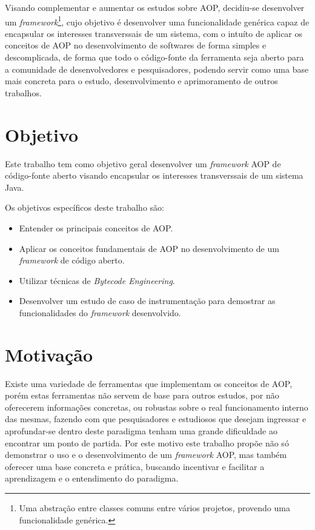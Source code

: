 \documentclass[tc,openright]{iiufrgs}
\begin{document}
Visando complementar e aumentar os estudos sobre AOP, decidiu-se desenvolver um \textit{framework}\footnote{Uma abstração entre classes comuns entre vários projetos, provendo uma funcionalidade genérica.}, cujo objetivo é desenvolver uma funcionalidade genérica capaz de encapsular os interesses transverssais de um sistema, com o intuíto de aplicar os conceitos de AOP no desenvolvimento de softwares de forma simples e descomplicada, de forma que todo o código-fonte da ferramenta seja aberto para a comunidade de desenvolvedores e pesquisadores, podendo servir como uma base mais concreta para o estudo, desenvolvimento e aprimoramento de outros trabalhos.

\section{Objetivo}
Este trabalho tem como objetivo geral desenvolver um \textit{framework} AOP de código-fonte aberto visando encapsular os interesses transverssais de um sistema Java.

Os objetivos específicos deste trabalho são: 

\begin{itemize}
\item Entender os principais conceitos de AOP.
\item Aplicar os conceitos fundamentais de AOP no desenvolvimento de um \textit{framework} de código aberto.
\item Utilizar técnicas de \textit{Bytecode Engineering}.
\item Desenvolver um estudo de caso de instrumentação para demostrar as funcionalidades do \textit{framework} desenvolvido.
\end{itemize}

\section{Motivação}

Existe uma variedade de ferramentas que implementam os conceitos de AOP, porém estas ferramentas não servem de base para outros estudos, por não oferecerem informações concretas, ou robustas sobre o real funcionamento interno das mesmas, fazendo com que pesquisadores e estudiosos que desejam ingressar e aprofundar-se dentro deste paradigma tenham uma grande dificuldade ao encontrar um ponto de partida. Por este motivo este trabalho propõe não só demonstrar o uso e o desenvolvimento de um \textit{framework} AOP, mas também oferecer uma base concreta e prática, buscando incentivar e facilitar a aprendizagem e o entendimento do paradigma.
\end{document}

